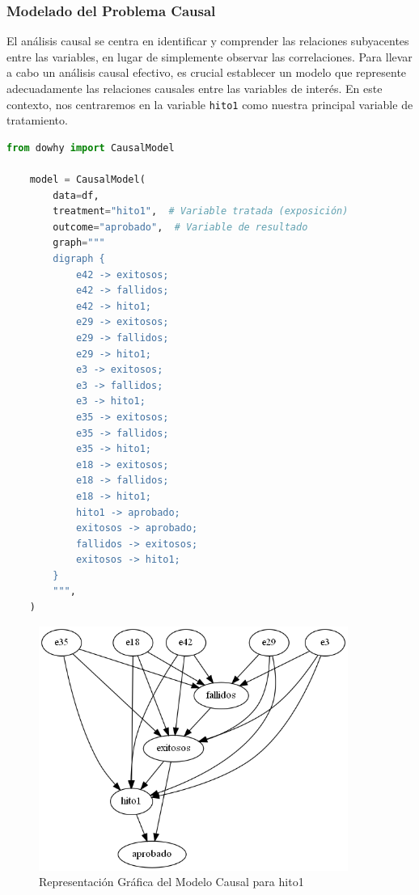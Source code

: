 \subsubsection{Modelado del Problema Causal}

El análisis causal se centra en identificar y comprender las relaciones subyacentes entre las variables, en lugar de simplemente observar las correlaciones. Para llevar a cabo un análisis causal efectivo, es crucial establecer un modelo que represente adecuadamente las relaciones causales entre las variables de interés. En este contexto, nos centraremos en la variable \texttt{hito1} como nuestra principal variable de tratamiento.

\begin{lstlisting}[language=Python, caption=Construcción del Modelo Causal para hito1, label=lst:model_causalHito1]
    from dowhy import CausalModel
    
    model = CausalModel(
        data=df,
        treatment="hito1",  # Variable tratada (exposición)
        outcome="aprobado",  # Variable de resultado
        graph="""
        digraph {
            e42 -> exitosos;
            e42 -> fallidos;
            e42 -> hito1;
            e29 -> exitosos;
            e29 -> fallidos;
            e29 -> hito1;
            e3 -> exitosos;
            e3 -> fallidos;
            e3 -> hito1;
            e35 -> exitosos;
            e35 -> fallidos;
            e35 -> hito1;
            e18 -> exitosos;
            e18 -> fallidos;
            e18 -> hito1;
            hito1 -> aprobado;
            exitosos -> aprobado;
            fallidos -> exitosos;
            exitosos -> hito1;
        }
        """,
    )
            \end{lstlisting}


\begin{figure}[H]


        \centering
        \includegraphics[width=0.9\textwidth]{img/causalidad/graph_causal_model_hito1.png}
        \caption{Representación Gráfica del Modelo Causal para hito1}
        \label{fig:modelo_causal_hito1}

\end{figure}

